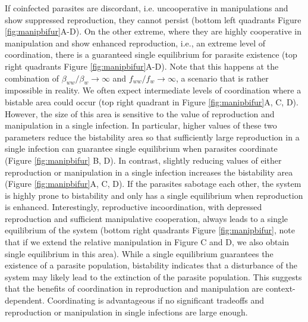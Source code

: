\documentclass[a4paper]{scrartcl}
\begin{document}
If coinfected parasites are discordant, i.e. uncooperative in manipulations and show suppressed reproduction, they cannot persist (bottom left quadrants Figure \ref{fig:manipbifur}A-D). 
On the other extreme, where they are highly cooperative in manipulation and show enhanced reproduction, i.e., an extreme level of coordination, there is a guaranteed single equilibrium for parasite existence (top right quadrants Figure \ref{fig:manipbifur}A-D). 
Note that this happens at the combination of $\beta_{ww}/\beta_w \rightarrow \infty$ and $f_{ww}/f_w \rightarrow \infty$, a scenario that is rather impossible in reality. 
We often expect intermediate levels of coordination where a bistable area could occur (top right quadrant in Figure \ref{fig:manipbifur}A, C, D).
However, the size of this area is sensitive to the value of reproduction and manipulation in a single infection. 
In particular, higher values of these two parameters reduce the bistability area so that sufficiently large reproduction in a single infection can guarantee single equilibrium when parasites coordinate (Figure \ref{fig:manipbifur} B, D).
In contrast, slightly reducing values of either reproduction or manipulation in a single infection increases the bistability area (Figure \ref{fig:manipbifur}A, C, D).
If the parasites sabotage each other, the system is highly prone to bistability and only has a single equilibrium when reproduction is enhanced.
Interestingly, reproductive incoordination, with depressed reproduction and sufficient manipulative cooperation, always leads to a single equilibrium of the system (bottom right quadrants Figure \ref{fig:manipbifur}, note that if we extend the relative manipulation in Figure C and D, we also obtain single equilibrium in this area). 
While a single equilibrium guarantees the existence of a parasite population, bistability indicates that a disturbance of the system may likely lead to the extinction of the parasite population. 
This suggests that the benefits of coordination in reproduction and manipulation are context-dependent. 
Coordinating is advantageous if no significant tradeoffs and reproduction or manipulation in single infections are large enough. 
\end{document}
